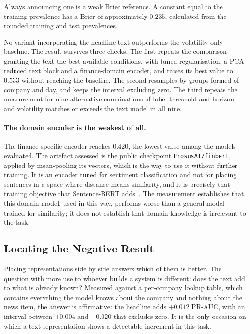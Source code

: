 \documentclass[runningheads]{llncs}
\begin{document}
Always announcing one is a weak Brier reference. A constant equal to the training prevalence
has a Brier of approximately $0.235$, calculated from the rounded training and test prevalences.

No variant incorporating the headline text outperforms the volatility-only baseline. The
result survives three checks. The first repeats the comparison granting the text the best
available conditions, with tuned regularisation, a PCA-reduced text block and a
finance-domain encoder, and raises its best value to $0.533$ without reaching the baseline.
The second resamples by groups formed of company and day, and keeps the interval excluding
zero. The third repeats the measurement for nine alternative combinations of label
threshold and horizon, and volatility matches or exceeds the text model in all nine.

\paragraph{The domain encoder is the weakest of all.} The finance-specific encoder reaches
$0.420$, the lowest value among the models evaluated. The artefact assessed is the public
checkpoint \texttt{ProsusAI/finbert}, applied by mean-pooling its vectors, which is the way
to use it without further training. It is an encoder tuned for sentiment classification and
not for placing sentences in a space where distance means similarity, and it is precisely
that training objective that Sentence-BERT adds~\cite{reimers2019sbert}. The measurement
establishes that this domain model, used in this way, performs worse than a general model
trained for similarity; it does not establish that domain knowledge is irrelevant to the
task.

\subsection{Locating the Negative Result}

Placing representations side by side answers which of them is better. The question with
more use to whoever builds a system is different: does the text add to what is already
known? Measured against a per-company lookup table, which contains everything the model
knows about the company and nothing about the news item, the answer is affirmative: the
headline adds $+0.012$ PR-AUC, with an interval between $+0.004$ and $+0.020$ that excludes
zero. It is the only occasion on which a text representation shows a detectable increment
in this task.
\end{document}
